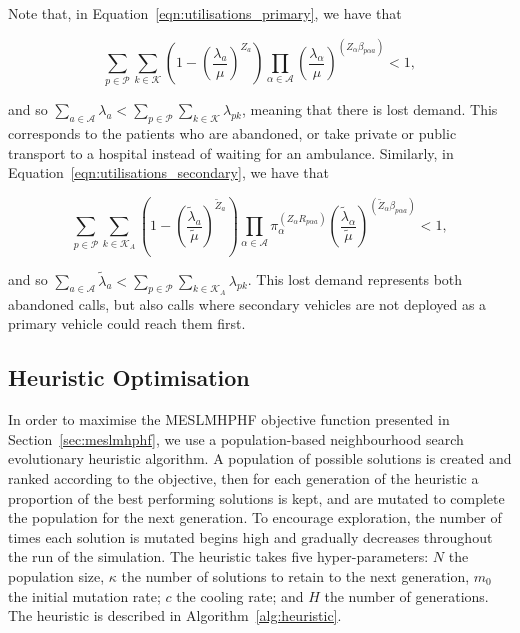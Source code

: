\documentclass[preprint,12pt]{elsarticle}
\begin{document}
Note that, in Equation~\ref{eqn:utilisations_primary}, we have that

$$\sum_{p \in \mathcal{P}} \sum_{k \in \mathcal{K}} \left( 1 - \left(\frac{\lambda_a}{\mu}\right)^{Z_a} \right) \prod_{\alpha \in \mathcal{A}} \left(\frac{\lambda_{\alpha}}{\mu}\right)^{\left(Z_{\alpha} \beta_{p \alpha a}\right)} < 1,$$

\noindent
and so
$\sum_{a \in \mathcal{A}} \lambda_a < \sum_{p \in \mathcal{P}} \sum_{k \in \mathcal{K}} \lambda_{pk}$,
meaning that there is lost demand. This corresponds to the patients
who are abandoned, or take private or public transport to a hospital instead of
waiting for an ambulance. Similarly, in
Equation~\ref{eqn:utilisations_secondary}, we have that

$$\sum_{p \in \mathcal{P}} \sum_{k \in \mathcal{K}_A} \left( 1 - \left(\frac{\tilde{\lambda}_a}{\tilde{\mu}}\right)^{\tilde{Z}_a} \right) \prod_{\alpha \in \mathcal{A}} \pi_{\alpha}^{\left(Z_{\alpha} R_{p \alpha a}\right)} \left(\frac{\tilde{\lambda}_{\alpha}}{\tilde{\mu}}\right)^{ \left(\tilde{Z}_{\alpha} \beta_{p \alpha a}\right)} < 1,$$

\noindent
and so
$\sum_{a \in \mathcal{A}} \tilde{\lambda}_a < \sum_{p \in \mathcal{P}} \sum_{k \in \mathcal{K}_A} \lambda_{pk}$.
This lost demand represents both abandoned calls, but also calls where secondary
vehicles are not deployed as a primary vehicle could reach them first.



\subsection{Heuristic Optimisation}\label{sec:heuristic}
In order to maximise the MESLMHPHF objective function presented in
Section~\ref{sec:meslmhphf}, we use a population-based neighbourhood search
evolutionary heuristic algorithm. A population of possible solutions is
created and ranked according to the objective, then for each generation of the
heuristic a proportion of the best performing solutions is kept, and are
mutated to complete the population for the next generation. To encourage
exploration, the number of times each solution is mutated begins high and
gradually decreases throughout the run of the simulation.
The heuristic takes five hyper-parameters: $N$ the population size, $\kappa$
the number of solutions to retain to the next generation, $m_0$ the initial
mutation rate; $c$ the cooling rate; and $H$ the number of generations. The
heuristic is described in Algorithm~\ref{alg:heuristic}.
\end{document}
